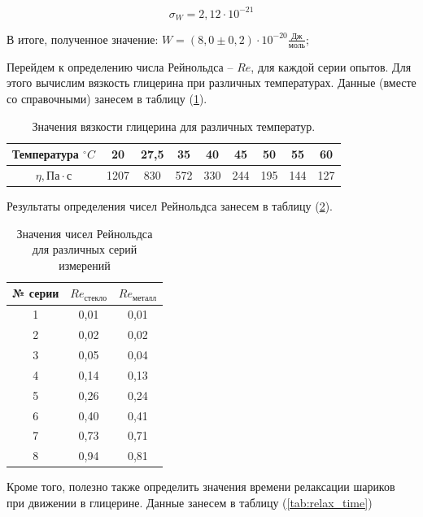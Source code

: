 \documentclass[12pt,a4paper]{article}
\begin{document}
$$\sigma_{W} = 2,12 \cdot 10^{-21}$$

В итоге, полученное значение: $W = \left(8,0 \pm 0,2\right)\cdot 10^{-20} \frac{\text{Дж}}{\text{моль}}$;

Перейдем к определению числа Рейнольдса -- $Re$, для каждой серии опытов. Для этого вычислим вязкость глицерина при различных температурах. Данные (вместе со справочными) занесем в таблицу (\ref{tab:results}).

\begin{table}[h]
\centering
\begin{tabular}{|c|c|c|c|c|c|c|c|c|}
\hline
Температура  $^\circ C$     & 20   & 27,5 & 35  & 40  & 45  & 50  & 55  & 60  \\ \hline
$\eta, \text{Па} \cdot \text{с}$ & 1207 & 830  & 572 & 330 & 244 & 195 & 144 & 127 \\ \hline
\end{tabular}
\caption{Значения вязкости глицерина для различных температур.}
\label{tab:results}
\end{table}  

Результаты определения чисел Рейнольдса занесем в таблицу (\ref{tab:reynolds_number}).

\begin{table}[h!]
\centering
\begin{tabular}{|c|c|c|}
\hline
№ серии & $Re_{\text{стекло}}$ & $Re_{\text{металл}}$ \\ \hline
1       & 0,01                 & 0,01                 \\ \hline
2       & 0,02                 & 0,02                 \\ \hline
3       & 0,05                 & 0,04                 \\ \hline
4       & 0,14                 & 0,13                 \\ \hline
5       & 0,26                 & 0,24                 \\ \hline
6       & 0,40                 & 0,41                 \\ \hline
7       & 0,73                 & 0,71                 \\ \hline
8       & 0,94                 & 0,81                 \\ \hline
\end{tabular}
\caption{Значения чисел Рейнольдса для различных серий измерений}
\label{tab:reynolds_number}
\end{table}

Кроме того, полезно также определить значения времени релаксации шариков при движении в глицерине. Данные занесем в таблицу (\ref{tab:relax_time})
\end{document}
